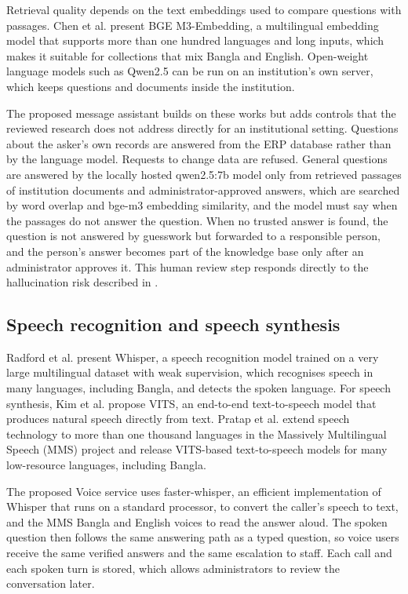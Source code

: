 Retrieval quality depends on the text embeddings used to compare questions with passages. Chen et al. \cite{chen2024bgem3} present BGE M3-Embedding, a multilingual embedding model that supports more than one hundred languages and long inputs, which makes it suitable for collections that mix Bangla and English. Open-weight language models such as Qwen2.5 \cite{qwen2024qwen25} can be run on an institution's own server, which keeps questions and documents inside the institution.

The proposed message assistant builds on these works but adds controls that the reviewed research does not address directly for an institutional setting. Questions about the asker's own records are answered from the ERP database rather than by the language model. Requests to change data are refused. General questions are answered by the locally hosted qwen2.5:7b model only from retrieved passages of institution documents and administrator-approved answers, which are searched by word overlap and bge-m3 embedding similarity, and the model must say when the passages do not answer the question. When no trusted answer is found, the question is not answered by guesswork but forwarded to a responsible person, and the person's answer becomes part of the knowledge base only after an administrator approves it. This human review step responds directly to the hallucination risk described in \cite{ji2023hallucination}.

\subsection{Speech recognition and speech synthesis}
Radford et al. \cite{radford2023whisper} present Whisper, a speech recognition model trained on a very large multilingual dataset with weak supervision, which recognises speech in many languages, including Bangla, and detects the spoken language. For speech synthesis, Kim et al. \cite{kim2021vits} propose VITS, an end-to-end text-to-speech model that produces natural speech directly from text. Pratap et al. \cite{pratap2023mms} extend speech technology to more than one thousand languages in the Massively Multilingual Speech (MMS) project and release VITS-based text-to-speech models for many low-resource languages, including Bangla.

The proposed Voice service uses faster-whisper, an efficient implementation of Whisper that runs on a standard processor, to convert the caller's speech to text, and the MMS Bangla and English voices to read the answer aloud. The spoken question then follows the same answering path as a typed question, so voice users receive the same verified answers and the same escalation to staff. Each call and each spoken turn is stored, which allows administrators to review the conversation later.

